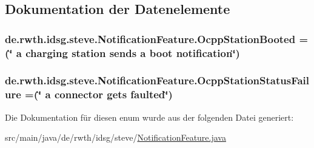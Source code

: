 \subsection{Dokumentation der Datenelemente}
\hypertarget{enumde_1_1rwth_1_1idsg_1_1steve_1_1_notification_feature_a3dd5693c79879d05167f2bc23d81acce}{
\subsubsection[{Ocpp\+Station\+Booted}]{\setlength{\rightskip}{0pt plus 5cm}de.\+rwth.\+idsg.\+steve.\+Notification\+Feature.\+Ocpp\+Station\+Booted =(\char`\"{} a charging station sends a boot notification\char`\"{})}}\label{enumde_1_1rwth_1_1idsg_1_1steve_1_1_notification_feature_a3dd5693c79879d05167f2bc23d81acce}
\hypertarget{enumde_1_1rwth_1_1idsg_1_1steve_1_1_notification_feature_a70aaa3d84c7d8acc92e81c9f37d3eb1d}{
\subsubsection[{Ocpp\+Station\+Status\+Failure}]{\setlength{\rightskip}{0pt plus 5cm}de.\+rwth.\+idsg.\+steve.\+Notification\+Feature.\+Ocpp\+Station\+Status\+Failure =(\char`\"{} a connector gets faulted\char`\"{})}}\label{enumde_1_1rwth_1_1idsg_1_1steve_1_1_notification_feature_a70aaa3d84c7d8acc92e81c9f37d3eb1d}


Die Dokumentation für diesen enum wurde aus der folgenden Datei generiert\+:\begin{DoxyCompactItemize}
\item 
src/main/java/de/rwth/idsg/steve/\hyperlink{_notification_feature_8java}{Notification\+Feature.\+java}\end{DoxyCompactItemize}
